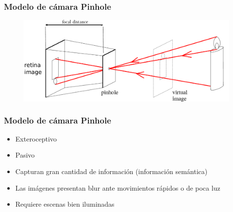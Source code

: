 \begin{frame}
    \frametitle{Modelo de cámara Pinhole}
    
    \begin{figure}[!h]
        \includegraphics[width=0.6\columnwidth]{images/pinhole_camera_virtual_image.pdf}
    \end{figure}   
\end{frame}

\begin{frame}
    \frametitle{Modelo de cámara Pinhole}
    \scriptsize
    \begin{figure}[!h]
    \end{figure}

    \begin{itemize}
        \item Exteroceptivo
        \item Pasivo
        \item Capturan gran cantidad de información (información semántica)
        \item Las imágenes presentan blur ante movimientos rápidos o de poca luz
        \item Requiere escenas bien iluminadas
    \end{itemize}

\end{frame}


